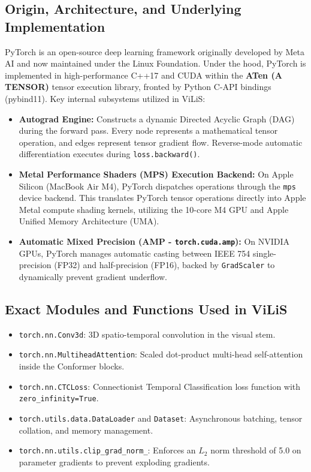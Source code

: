 \documentclass[11pt,a4paper]{report}
\begin{document}
\subsection{Origin, Architecture, and Underlying Implementation}
PyTorch is an open-source deep learning framework originally developed by Meta AI and now maintained under the Linux Foundation. 
Under the hood, PyTorch is implemented in high-performance C++17 and CUDA within the \textbf{ATen (A TENSOR)} tensor execution library, fronted by Python C-API bindings (pybind11).
Key internal subsystems utilized in ViLiS:
\begin{itemize}
    \item \textbf{Autograd Engine:} Constructs a dynamic Directed Acyclic Graph (DAG) during the forward pass. Every node represents a mathematical tensor operation, and edges represent tensor gradient flow. Reverse-mode automatic differentiation executes during \texttt{loss.backward()}.
    \item \textbf{Metal Performance Shaders (MPS) Execution Backend:} On Apple Silicon (MacBook Air M4), PyTorch dispatches operations through the \texttt{mps} device backend. This translates PyTorch tensor operations directly into Apple Metal compute shading kernels, utilizing the 10-core M4 GPU and Apple Unified Memory Architecture (UMA).
    \item \textbf{Automatic Mixed Precision (AMP - \texttt{torch.cuda.amp}):} On NVIDIA GPUs, PyTorch manages automatic casting between IEEE 754 single-precision (FP32) and half-precision (FP16), backed by \texttt{GradScaler} to dynamically prevent gradient underflow.
\end{itemize}

\subsection{Exact Modules and Functions Used in ViLiS}
\begin{itemize}
    \item \texttt{torch.nn.Conv3d}: 3D spatio-temporal convolution in the visual stem.
    \item \texttt{torch.nn.MultiheadAttention}: Scaled dot-product multi-head self-attention inside the Conformer blocks.
    \item \texttt{torch.nn.CTCLoss}: Connectionist Temporal Classification loss function with \texttt{zero\_infinity=True}.
    \item \texttt{torch.utils.data.DataLoader} and \texttt{Dataset}: Asynchronous batching, tensor collation, and memory management.
    \item \texttt{torch.nn.utils.clip\_grad\_norm\_}: Enforces an $L_2$ norm threshold of 5.0 on parameter gradients to prevent exploding gradients.
\end{itemize}
\end{document}
